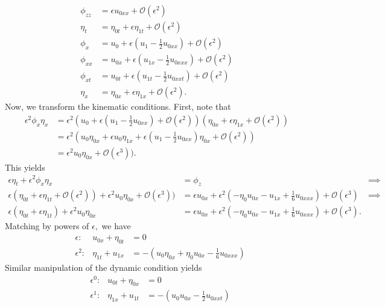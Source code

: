 \documentclass[10pt,reqno,oneside,a4paper]{article}
\begin{document}
\begin{enumerate}
\begin{align*}
\phi_{zz} &= \epsilon u_{0xx} + \mathcal{O}(\epsilon^2) \\
\eta_t &= \eta_{0t} + \epsilon \eta_{1t} + \mathcal{O}(\epsilon^2) \\
\phi_x &= u_0 + \epsilon(u_1 - \frac{1}{2}u_{0xx}) + \mathcal{O}(\epsilon^2) \\
\phi_{xx} &= u_{0x} + \epsilon(u_{1x} - \frac{1}{2}u_{0xxx}) + \mathcal{O}(\epsilon^2) \\
\phi_{xt} &= u_{0t} + \epsilon(u_{1t} - \frac{1}{2}u_{0xxt}) + \mathcal{O}(\epsilon^2) \\
\eta_x &= \eta_{0x} + \epsilon \eta_{1x} + \mathcal{O}(\epsilon^2).
\end{align*}
Now, we transform the kinematic conditions. First, note that 
\begin{align*}
\epsilon^2 \phi_x \eta_x &= \epsilon^2(u_0 + \epsilon(u_1 - \frac{1}{2}u_{0xx}) + \mathcal{O}(\epsilon^2))(\eta_{0x} + \epsilon \eta_{1x} + \mathcal{O}(\epsilon^2)) \\
&= \epsilon^2(u_0\eta_{0x}  + \epsilon u_0 \eta_{1x} + \epsilon(u_1 - \frac{1}{2}u_{0xx})\eta_{0x} + \mathcal{O}(\epsilon^2))\\
&= \epsilon^2 u_0\eta_{0x}  + \mathcal{O}(\epsilon^3)).
\end{align*} 
This yields
\begin{align*}
\epsilon \eta_t + \epsilon^2 \phi_x \eta_x &= \phi_z &\implies \\
\epsilon(\eta_{0t} + \epsilon \eta_{1t} + \mathcal{O}(\epsilon^2)) + \epsilon^2 u_0\eta_{0x}  + \mathcal{O}(\epsilon^3)) &= \epsilon u_{0x} + \epsilon^2(-\eta_0 u_{0x} - u_{1x} + \frac{1}{6}u_{0xxx}) + \mathcal{O}(\epsilon^3) &\implies \\
\epsilon(\eta_{0t} + \epsilon \eta_{1t}) + \epsilon^2 u_0\eta_{0x} &= \epsilon u_{0x} + \epsilon^2(-\eta_0 u_{0x} - u_{1x} + \frac{1}{6}u_{0xxx}) + \mathcal{O}(\epsilon^3).
\end{align*}
Matching by powers of $\epsilon,$ we have
\begin{align*}
&\epsilon: & u_{0x} + \eta_{0t} &= 0\\
&\epsilon^2: & \eta_{1t}+ u_{1x} &= -(u_0\eta_{0x} + \eta_0 u_{0x} - \frac{1}{6}u_{0xxx}) 
\end{align*}
Similar manipulation of the dynamic condition yields
\begin{align*}
&\epsilon^0: & u_{0t} + \eta_{0x} &= 0\\
&\epsilon^1: & \eta_{1x}+ u_{1t} &= -(u_0 u_{0x} - \frac{1}{2}u_{0xxt}) 
\end{align*}

\end{enumerate}
\end{document}
